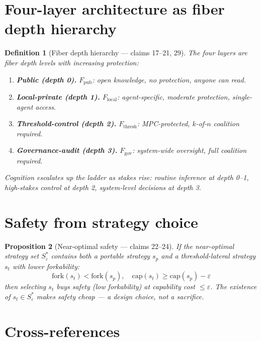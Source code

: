 \documentclass[11pt,a4paper]{article}
\newtheorem{definition}{Definition}[section]
\newtheorem{proposition}[definition]{Proposition}
\begin{document}
\section{Four-layer architecture as fiber depth hierarchy}

\begin{definition}[Fiber depth hierarchy --- claims 17--21, 29]
\label{def:layers}
The four layers are fiber depth levels with increasing protection:
\begin{enumerate}
  \item \textbf{Public (depth 0).} $F_{\text{pub}}$: open knowledge,
    no protection, anyone can read.
  \item \textbf{Local-private (depth 1).} $F_{\text{local}}$:
    agent-specific, moderate protection, single-agent access.
  \item \textbf{Threshold-control (depth 2).} $F_{\text{thresh}}$:
    MPC-protected, $k$-of-$n$ coalition required.
  \item \textbf{Governance-audit (depth 3).} $F_{\text{gov}}$:
    system-wide oversight, full coalition required.
\end{enumerate}
Cognition escalates up the ladder as stakes rise: routine inference
at depth 0--1, high-stakes control at depth 2, system-level decisions
at depth 3.
\end{definition}

\section{Safety from strategy choice}

\begin{proposition}[Near-optimal safety --- claims 22--24]
\label{prop:strategy}
If the near-optimal strategy set $S^*_\varepsilon$ contains both a
portable strategy $s_p$ and a threshold-lateral strategy $s_t$ with
lower forkability:
\[
  \text{fork}(s_t) < \text{fork}(s_p), \quad
  \text{cap}(s_t) \geq \text{cap}(s_p) - \varepsilon
\]
then selecting $s_t$ buys safety (low forkability) at capability cost
$\leq \varepsilon$. The existence of $s_t \in S^*_\varepsilon$ makes
safety cheap --- a design choice, not a sacrifice.
\end{proposition}


\section{Cross-references}
\end{document}
